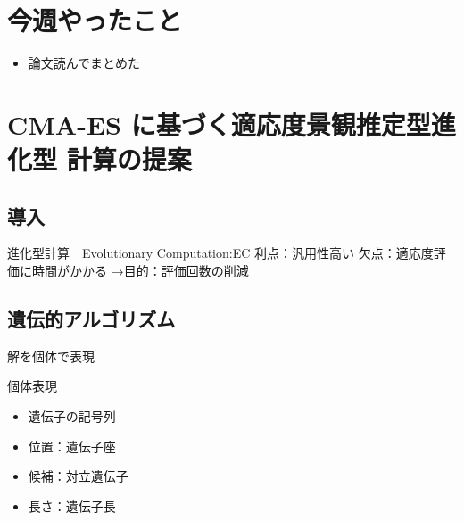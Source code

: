 \documentclass[twocolumn]{jarticle}     %
\begin{document}


\section{今週やったこと}
\begin{itemize}
	\item {論文読んでまとめた}
\end{itemize}



\section{CMA-ES に基づく適応度景観推定型進化型
計算の提案}
%

\subsection{導入}
進化型計算　Evolutionary Computation:EC
利点：汎用性高い
欠点：適応度評価に時間がかかる
→目的：評価回数の削減

\subsection{遺伝的アルゴリズム}
解を個体で表現

個体表現
\begin{itemize}
  \item 遺伝子の記号列
  \item 位置：遺伝子座
  \item 候補：対立遺伝子
  \item 長さ：遺伝子長
\end{itemize}
\end{document}
